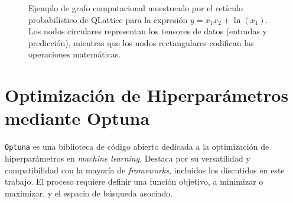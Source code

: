 \documentclass[11pt, a4paper]{article}
\begin{document}
\FloatBarrier
\begin{figure}[h]
    \centering
    \caption{Ejemplo de grafo computacional muestreado por el retículo probabilístico de QLattice para la expresión $y = x_1 x_2 + \ln(x_1)$. Los nodos circulares representan los tensores de datos (entradas y predicción), mientras que los nodos rectangulares codifican las operaciones matemáticas.}
    \label{fig:qlattice_graph}
\end{figure}




\section{Optimización de Hiperparámetros mediante Optuna}
\texttt{Optuna} \cite{akiba2019optuna} es una biblioteca de código abierto dedicada a la optimización de hiperparámetros en \textit{machine learning}. Destaca por su versatilidad y compatibilidad con la mayoría de \textit{frameworks}, incluidos los discutidos en este trabajo. El proceso requiere definir una función objetivo, a minimizar o maximizar, y el espacio de búsqueda asociado.
\end{document}
